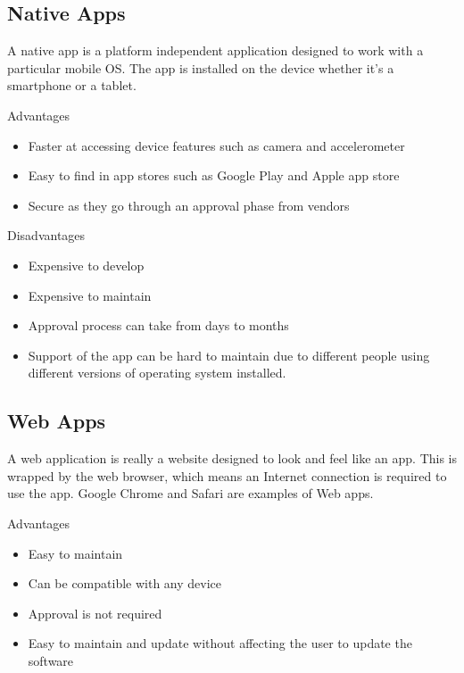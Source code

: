 \subsection{Native Apps}

A native app is a platform independent application designed to work with a particular mobile OS. The app is installed on the device whether it’s a smartphone or a tablet.

Advantages

\begin{itemize}
	\item Faster at accessing device features such as camera and accelerometer
	\item Easy to find in app stores such as Google Play and Apple app store
	\item Secure as they go through an approval phase from vendors 
\end{itemize}


Disadvantages

\begin{itemize}
	\item Expensive to develop 
	\item Expensive to maintain 
	\item Approval process can take from days to months
	\item Support of the app can be hard to maintain due to different people using different versions of operating system installed.
\end{itemize}

\subsection{Web Apps}

A web application is really a website designed to look and feel like an app. This is wrapped by the web browser, which means an Internet connection is required to use the app. Google Chrome and Safari are examples of Web apps. 

Advantages

\begin{itemize}
	\item Easy to maintain 
	\item Can be compatible with any device 
	\item Approval is not required
	\item Easy to maintain and update without affecting the user to update the software 
\end{itemize}

